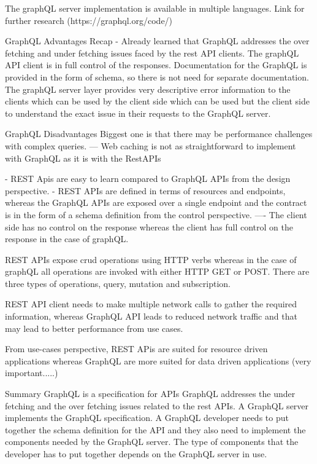 The graphQL server implementation is available in multiple languages.
Link for further research (https://graphql.org/code/)

GraphQL Advantages
Recap - Already learned that GraphQL addresses the over fetching and under fetching issues faced by the rest API clients.
The graphQL API client is in full control of the responses.
Documentation for the GraphQL is provided in the form of schema, so there is not need for separate documentation.
The graphQL server layer provides very descriptive error information to the clients which can be used by the client side which can be used but the client side to understand the exact issue in their requests to the GraphQL server.

GraphQL Disadvantages
Biggest one is that there may be performance challenges with complex queries.
--- Web caching is not as straightforward to implement with GraphQL as it is with the RestAPIs

- REST Apis are easy to learn compared to GraphQL APIs from the design perspective.
- REST APIs are defined in terms of resources and endpoints, whereas the GraphQL APIs are exposed over a single endpoint and the contract is in the form of a schema definition from the control perspective.
---- The client side has no control on the response whereas the client has full control on the response in the case of graphQL.

REST APIs expose crud operations using HTTP verbs whereas in the case of graphQL all operations are invoked with either HTTP GET or POST.
There are three types of operations, query, mutation and subscription.

REST API client needs to make multiple network calls to gather the required information, whereas GraphQL API leads to reduced network traffic and that may lead to better performance from use cases.

From use-cases perspective, REST APis are suited for resource driven applications whereas GraphQL are more suited for data driven applications (very important.....)

Summary
GraphQL is a specification for APIs
GraphQL addresses the under fetching and the over fetching issues related to the rest APIs.
A GraphQL server implements the GraphQL specification.
A GraphQL developer needs to put together the schema definition for the API and they also need to implement the components needed by the GraphQL server.
The type of components that the developer has to put together depends on the GraphQL server in use.

